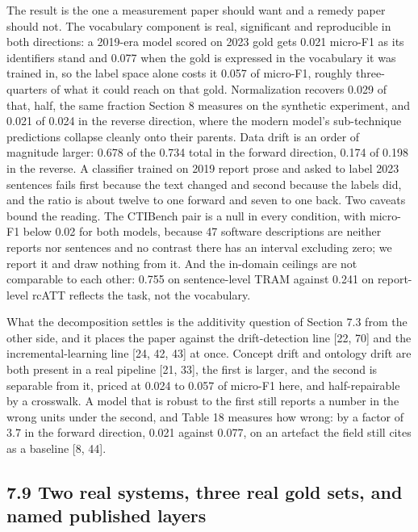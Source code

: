 \documentclass[11pt,a4paper]{article}
\begin{document}
The result is the one a measurement paper should want and a remedy paper should not. The vocabulary component is real, significant and reproducible in both directions: a 2019-era model scored on 2023 gold gets 0.021 micro-F1 as its identifiers stand and 0.077 when the gold is expressed in the vocabulary it was trained in, so the label space alone costs it 0.057 of micro-F1, roughly three-quarters of what it could reach on that gold. Normalization recovers 0.029 of that, half, the same fraction Section 8 measures on the synthetic experiment, and 0.021 of 0.024 in the reverse direction, where the modern model's sub-technique predictions collapse cleanly onto their parents. Data drift is an order of magnitude larger: 0.678 of the 0.734 total in the forward direction, 0.174 of 0.198 in the reverse. A classifier trained on 2019 report prose and asked to label 2023 sentences fails first because the text changed and second because the labels did, and the ratio is about twelve to one forward and seven to one back. Two caveats bound the reading. The CTIBench pair is a null in every condition, with micro-F1 below 0.02 for both models, because 47 software descriptions are neither reports nor sentences and no contrast there has an interval excluding zero; we report it and draw nothing from it. And the in-domain ceilings are not comparable to each other: 0.755 on sentence-level TRAM against 0.241 on report-level rcATT reflects the task, not the vocabulary.

What the decomposition settles is the additivity question of Section 7.3 from the other side, and it places the paper against the drift-detection line [22, 70] and the incremental-learning line [24, 42, 43] at once. Concept drift and ontology drift are both present in a real pipeline [21, 33], the first is larger, and the second is separable from it, priced at 0.024 to 0.057 of micro-F1 here, and half-repairable by a crosswalk. A model that is robust to the first still reports a number in the wrong units under the second, and Table 18 measures how wrong: by a factor of 3.7 in the forward direction, 0.021 against 0.077, on an artefact the field still cites as a baseline [8, 44].

\subsection{7.9 Two real systems, three real gold sets, and named published layers}
\end{document}
